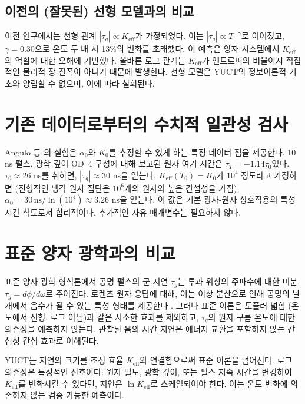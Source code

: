 \documentclass[12pt,a4paper]{article}
\newcommand{\Keff}{K_{\mathrm{eff}}}
\begin{document}
	\subsection{이전의 (잘못된) 선형 모델과의 비교}
	
	이전 연구에서는 선형 관계 \(|\tau_g| \propto \Keff\)가 가정되었다. 이는 \(|\tau_g| \propto T^{-\gamma}\)로 이어졌고, \(\gamma = 0.30\)으로 온도 두 배 시 13\%의 변화를 초래했다. 이 예측은 양자 시스템에서 \(\Keff\)의 역할에 대한 오해에 기반했다. 올바른 로그 관계는 \(\Keff\)가 엔트로피의 비율이지 직접적인 물리적 장 진폭이 아니기 때문에 발생한다. 선형 모델은 YUCT의 정보이론적 기초와 양립할 수 없으며, 이에 따라 철회된다.
	
	\section{기존 데이터로부터의 수치적 일관성 검사}
	
	Angulo 등 \cite{Angulo2024}의 실험은 \(\alpha_0\)와 \(K_0\)를 추정할 수 있게 하는 특정 데이터 점을 제공한다. 10 ns 펄스, 광학 깊이 OD~4 구성에 대해 보고된 원자 여기 시간은 \(\tau_T = -1.14 \tau_0\)였다. \(\tau_0 \approx 26\) ns를 취하면, \(|\tau_g| \approx 30\) ns을 얻는다. \(\Keff(T_0) = K_0\)가 \(10^4\) 정도라고 가정하면 (전형적인 냉각 원자 집단은 \(10^6\)개의 원자와 높은 간섭성을 가짐), \(\alpha_0 = 30\,\text{ns} / \ln(10^4) \approx 3.26\) ns을 얻는다. 이 값은 기본 광자-원자 상호작용의 특성 시간 척도로서 합리적이다. 추가적인 자유 매개변수는 필요하지 않다.
	
	\section{표준 양자 광학과의 비교}
	
	표준 양자 광학 형식론에서 공명 펄스의 군 지연 \(\tau_g\)는 투과 위상의 주파수에 대한 미분, \(\tau_g = d\phi/d\omega\)로 주어진다. 로렌츠 원자 응답에 대해, 이는 이상 분산으로 인해 공명의 날개에서 음수가 될 수 있는 특성 형태를 제공한다 \cite{Milonni2004}. 그러나 표준 이론은 도플러 넓힘 (온도에서 선형, 로그 아님)과 같은 사소한 효과를 제외하고, \(\tau_g\)의 원자 구름 온도에 대한 의존성을 예측하지 않는다. 관찰된 음의 시간 지연은 에너지 교환을 포함하지 않는 간섭성 간섭 효과로 이해된다.
	
	YUCT는 지연의 크기를 조정 효율 \(\Keff\)와 연결함으로써 표준 이론을 넘어선다. 로그 의존성은 특징적인 신호이다: 원자 밀도, 광학 깊이, 또는 펄스 지속 시간을 변경하여 \(\Keff\)를 변화시킬 수 있다면, 지연은 \(\ln\Keff\)로 스케일되어야 한다. 이는 온도 변화에 의존하지 않는 검증 가능한 예측이다.
	
\end{document}
